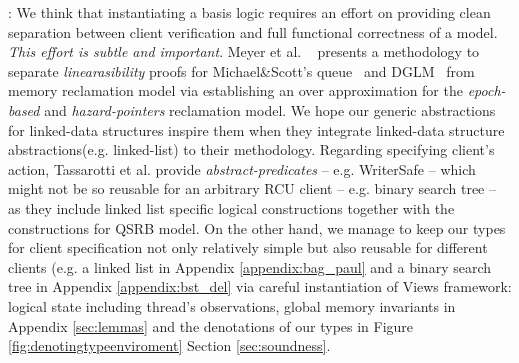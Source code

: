 : We think that instantiating a basis logic requires an effort on providing clean separation between client verification and full functional correctness of a model. \textit{This effort is subtle and important}. Meyer et al. ~\cite{myr} presents a methodology to separate \textit{linearasibility} proofs for Michael\&Scott's queue~\cite{Michael:1996:SFP:248052.248106} and DGLM~\cite{Doherty:2004:DSB:1007912.1007945} from memory reclamation model via establishing an over approximation for the \textit{epoch-based} and \textit{hazard-pointers} reclamation model. We hope our generic abstractions for linked-data structures inspire them when they integrate linked-data structure abstractions(e.g. linked-list) to their methodology. Regarding specifying client's action, Tassarotti et al. provide \textit{abstract-predicates} -- e.g. WriterSafe -- which might not be so reusable for an arbitrary RCU client -- e.g. binary search tree -- as they include linked list specific logical constructions together with the constructions for QSRB model. On the other hand, we manage to keep our types for client specification not only relatively simple but also reusable for different clients (e.g. a linked list in Appendix \ref{appendix:bag_paul} and a binary search tree in Appendix \ref{appendix:bst_del} via careful instantiation of Views framework: logical state including thread's observations, global memory invariants in Appendix \ref{sec:lemmas} and the denotations of our types in Figure \ref{fig:denotingtypeenviroment} Section \ref{sec:soundness}. 
